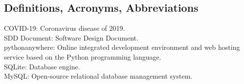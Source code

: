 \documentclass[12pt]{article}
\begin{document}
\subsection{Definitions, Acronyms, Abbreviations}
COVID-19: Coronavirus disease of 2019. \\
SDD Document: Software Design Document. \\
pythonanywhere: Online integrated development environment and web hosting service based on the Python programming language.\\
SQLite: Database engine. \\ 
MySQL: Open-source relational database management system. \\

\printbibliography
\end{document}
